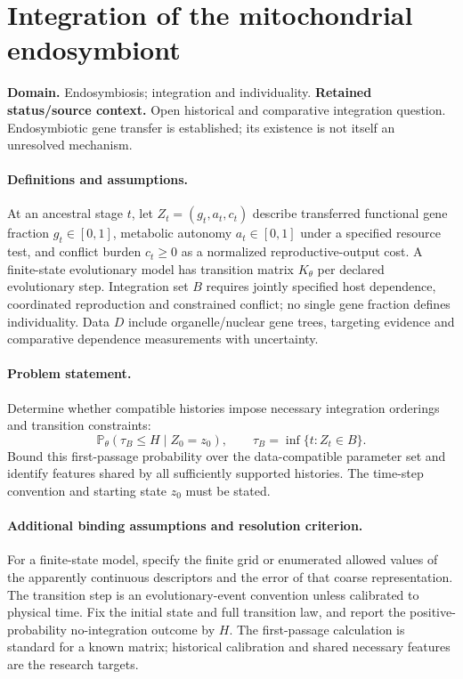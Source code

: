 \documentclass[11pt]{article}
\begin{document}
\section*{Integration of the mitochondrial endosymbiont}
\label{prob:306}
\label{rank:198}
\par\smallskip

\noindent\textbf{Domain.} Endosymbiosis; integration and individuality. \quad \textbf{Retained status/source context.} Open historical and comparative integration question. Endosymbiotic gene transfer is established; its existence is not itself an unresolved mechanism.

\paragraph{Definitions and assumptions.} At an ancestral stage $t$, let $Z_t=(g_t,a_t,c_t)$ describe transferred functional gene fraction $g_t\in[0,1]$, metabolic autonomy $a_t\in[0,1]$ under a specified resource test, and conflict burden $c_t\geq0$ as a normalized reproductive-output cost. A finite-state evolutionary model has transition matrix $K_\theta$ per declared evolutionary step. Integration set $B$ requires jointly specified host dependence, coordinated reproduction and constrained conflict; no single gene fraction defines individuality. Data $D$ include organelle/nuclear gene trees, targeting evidence and comparative dependence measurements with uncertainty.

\paragraph{Problem statement.} Determine whether compatible histories impose necessary integration orderings and transition constraints:
    \[\mathbb{P}_\theta(\tau_B\leq H\mid Z_0=z_0),\qquad
    \tau_B=\inf\{t:Z_t\in B\}.\]
    Bound this first-passage probability over the data-compatible parameter set and identify features shared by all sufficiently supported histories. The time-step convention and starting state $z_0$ must be stated.

\paragraph{Additional binding assumptions and resolution criterion.} For a finite-state model, specify the finite grid or enumerated allowed values of the apparently continuous descriptors and the error of that coarse representation. The transition step is an evolutionary-event convention unless calibrated to physical time. Fix the initial state and full transition law, and report the positive-probability no-integration outcome by $H$. The first-passage calculation is standard for a known matrix; historical calibration and shared necessary features are the research targets.
\end{document}
